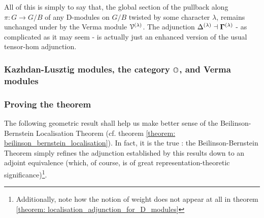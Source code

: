             All of this is simply to say that, the global section of the pullback along $\pi: G \to G/B$ of any D-modules on $G/B$ twisted by some character $\lambda$, remains unchanged under  by the Verma module $\mathcal{V}^{(\lambda)}$. The adjunction $\Delta^{(\lambda)} \dashv \mathbf{\Gamma}^{(\lambda)}$ - as complicated as it may seem - is actually just an enhanced version of the usual tensor-hom adjunction.
                    
            \subsubsection{Kazhdan-Lusztig modules, the category \texorpdfstring{$\mathbb{O}$}{}, and Verma modules}
                    
            \subsubsection{Proving the theorem}
                The following geometric result shall help us make better sense of the Beilinson-Bernstein Localisation Theorem (cf. theorem \ref{theorem: beilinson_bernstein_localisation}). In fact, it is the true : the Beilinson-Bernstein Theorem simply refines the adjunction established by this results down to an adjoint equivalence (which, of course, is of great representation-theoretic significance)\footnote{Additionally, note how the notion of weight does not appear at all in theorem \ref{theorem: localisation_adjunction_for_D_modules}}.
                
